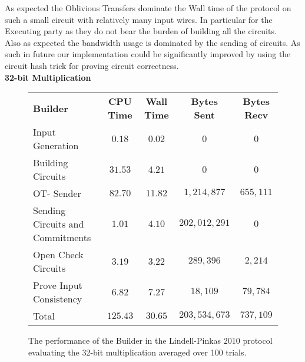 \documentclass[ %
                    author={Nicholas Tutte},
                supervisor={Prof. Nigel Smart},
                    degree={MEng},
                     title={Secure Two Party Computation},
                  subtitle={A practical comparison of recent protocols},
                      type={Research - GG1K},
                      year={2015} ]{dissertation}
\begin{document}
				As expected the Oblivious Transfers dominate the Wall time of the protocol on such a small circuit with relatively many input wires. In particular for the Executing party as they do not bear the burden of building all the circuits.\\

				Also as expected the bandwidth usage is dominated by the sending of circuits. As such in future our implementation could be significantly improved by using the circuit hash trick for proving circuit correctness.\\


				\FloatBarrier
				\noindent \textbf{32-bit Multiplication}
				\begin{figure}[!ht]
					\begin{tabular}{| p{4.3cm} | c c c c |}
						\hline
						\textbf{Builder} & \textbf{CPU Time} & \textbf{Wall Time} & \textbf{Bytes Sent} & \textbf{Bytes Recv} \\
						\thickhline
						Input Generation & $0.18$ & $0.02$ & $0$ & $0$ \\
						\hline
						Building Circuits & $31.53$ & $4.21$ & $0$ & $0$ \\
						\hline
						OT- Sender & $82.70$ & $11.82$ & $1,214,877$ & $655,111$ \\
						\hline
						Sending Circuits and Commitments & $1.01$ & $4.10$ & $202,012,291$ & $0$ \\
						\hline
						Open Check Circuits & $3.19$ & $3.22$ & $289,396$ & $2,214$ \\
						\hline
						Prove Input Consistency & $6.82$ & $7.27$ & $18,109$ & $79,784$ \\
						\thickhline
						Total & $125.43$ & $30.65$ & $203,534,673$ & $737,109$ \\
						\hline
					\end{tabular}

					\caption{The performance of the Builder in the Lindell-Pinkas 2010 protocol evaluating the 32-bit multiplication averaged over 100 trials. \label{table:LP_2010_Mul_Builder}}
				\end{figure}
				
\end{document}
